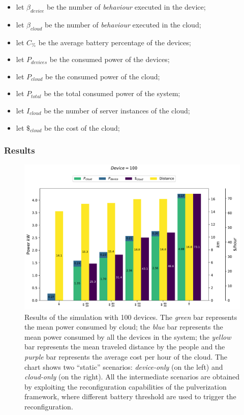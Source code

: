 \documentclass[conference]{IEEEtran}
\begin{document}
\begin{itemize}
    \item let $\beta_{device}$ be the number of \emph{behaviour} executed in the device;
    \item let $\beta_{cloud}$ be the number of \emph{behaviour} executed in the cloud;
    \item let $C_{\%}$ be the average battery percentage of the devices;
    \item let $P_{devices}$ be the consumed power of the devices;
    \item let $P_{cloud}$ be the consumed power of the cloud;
    \item let $P_{total}$ be the total consumed power of the system;
    \item let $I_{cloud}$ be the number of server instances of the cloud;
    \item let $\$_{cloud}$ be the cost of the cloud;
\end{itemize}

\subsubsection{Results}

\begin{figure}[ht]
    \begin{minipage}{\columnwidth}
        \includegraphics[width=\linewidth]{figures/cloud_cost-device_consumption-cloud_consumption-distance-device=100.0.pdf}
    \end{minipage}
    \caption{
        Results of the simulation with 100 devices.
        The \emph{green} bar represents the mean power consumed by cloud;
        the \emph{blue} bar represents the mean power consumed by all the devices in the system;
        the \emph{yellow} bar represents the mean traveled distance by the people
        and the \emph{purple} bar represents the average cost per hour of the cloud.
        The chart shows two ``static'' scenarios: \emph{device-only} (on the left) and \emph{cloud-only} (on the right).
        All the intermediate scenarios are obtained by exploiting the reconfiguration capabilities of the pulverization framework,
        where different battery threshold are used to trigger the reconfiguration.
    }
    \label{fig:result-100-devices}
\end{figure}
\end{document}
